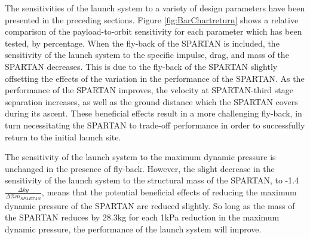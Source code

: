 The sensitivities of the launch system to a variety of design parameters have been presented in the preceding sections. Figure \ref{fig:BarChartreturn} shows a relative comparison of the payload-to-orbit sensitivity for each parameter which has been tested, by percentage. 
When the fly-back of the SPARTAN is included, the sensitivity of the launch system to the specific impulse, drag, and mass of the SPARTAN decreases.  
This is due to the fly-back of the SPARTAN slightly offsetting the effects of the variation in the performance of the SPARTAN. As the performance of the SPARTAN improves, the velocity at SPARTAN-third stage separation increases, as well as the ground distance which the SPARTAN covers during its ascent. These beneficial effects result in a more challenging fly-back, in turn necessitating the SPARTAN to trade-off performance in order to successfully return to the initial launch site.

The sensitivity of the launch system to the maximum dynamic pressure is unchanged in the presence of fly-back. However, the slight decrease in the sensitivity of the launch system to the structural mass of the SPARTAN, to -1.4$\frac{\Delta kg}{\Delta\%m_{SPARTAN}}$, means that the potential beneficial effects of reducing the maximum dynamic pressure of the SPARTAN are reduced slightly. So long as the mass of the SPARTAN reduces by 28.3kg for each 1kPa reduction in the maximum dynamic pressure, the performance of the launch system will improve.

